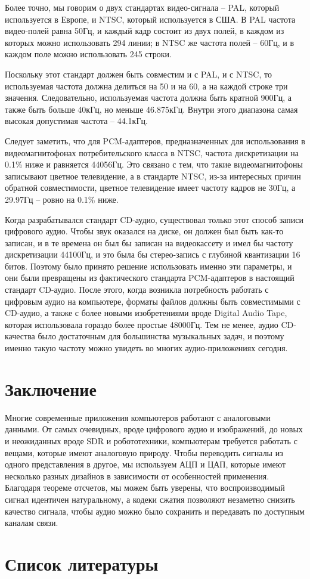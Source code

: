 \documentclass[a4page]{article}
\begin{document}
Более точно, мы говорим о двух стандартах видео-сигнала -- PAL, который используется в Европе,
и NTSC, который используется в США.
В PAL частота видео-полей равна 50Гц, и каждый кадр состоит из двух полей, в каждом из которых можно использовать 294 линии;
в NTSC же частота полей -- 60Гц, и в каждом поле можно использовать 245 строки.

Поскольку этот стандарт должен быть совместим и с PAL, и с NTSC,
то используемая частота должна делиться на 50 и на 60, а на каждой строке три значения.
Следовательно, используемая частота должна быть кратной  900Гц,
а также быть больше 40кГц, но меньше 46.875кГц.
Внутри этого диапазона самая высокая допустимая частота -- 44.1кГц.

Следует заметить, что для PCM-адаптеров, предназначенных для использования в видеомагнитофонах потребительского класса в NTSC,
частота дискретизации на 0.1\% ниже и равняется 44056Гц.
Это связано с тем, что такие видеомагнитофоны записывают цветное телевидение,
а в стандарте NTSC, из-за интересных причин обратной совместимости,
цветное телевидение имеет частоту кадров не 30Гц, а 29.97Гц -- ровно на 0.1\% ниже.

Когда разрабатывался стандарт CD-аудио, существовал только этот способ записи цифрового аудио.
Чтобы звук оказался на диске, он должен был быть как-то записан,
и в те времена он был бы записан на видеокассету и имел бы частоту дискретизации 44100Гц,
и это была бы стерео-запись с глубиной квантизации 16 битов.
Поэтому было принято решение использовать именно эти параметры,
и они были превращены из фактического стандарта PCM-адаптеров
в настоящий стандарт CD-аудио.
После этого, когда возникла потребность работать с цифровым аудио на компьютере,
форматы файлов должны быть совместимыми с CD-аудио,
а также с более новыми изобретениями вроде Digital Audio Tape,
которая использовала гораздо более простые 48000Гц.
Тем не менее, аудио CD-качества было достаточным для большинства музыкальных задач,
и поэтому именно такую частоту можно увидеть во многих аудио-приложениях сегодня.


\section{Заключение}

Многие современные приложения компьютеров работают с аналоговыми данными.
От самых очевидных, вроде цифрового аудио и изображений,
до новых и неожиданных вроде SDR и робототехники,
компьютерам требуется работать с вещами, которые имеют аналоговую природу.
Чтобы переводить сигналы из одного представления в другое, мы используем АЦП и ЦАП,
которые имеют несколько разных дизайнов в зависимости от особенностей применения.
Благодаря теореме отсчетов, мы можем быть уверены, что воспроизводимый сигнал идентичен натуральному,
а кодеки сжатия позволяют незаметно снизить качество сигнала, чтобы аудио можно было сохранить и передавать
по доступным каналам связи.

 

\newpage

\section{Список литературы}

\printbibliography [heading=none]
\end{document}
